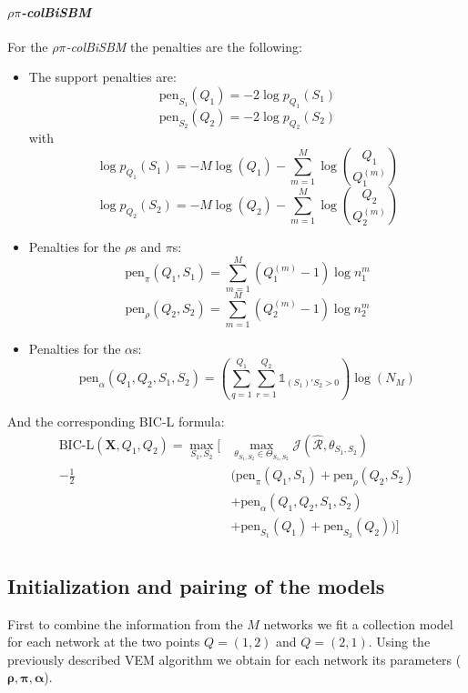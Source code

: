 \documentclass[12pt,a4paper]{report}
\begin{document}
\paragraph*{\textit{$\rho\pi$-colBiSBM}}
For the \textit{$\rho\pi$-colBiSBM} the penalties are the following:

\begin{itemize}
    \item The support penalties are:
          \[ \text{pen}_{S_1}(Q_1) = -2 \log p_{Q_1} (S_1) \]
          \[ \text{pen}_{S_2}(Q_2) = -2 \log p_{Q_2} (S_2) \]
          with
          \[ \log p_{Q_1}(S_1) = - M \log(Q_1) - \sum_{m=1}^{M} \log {Q_1 \choose Q_1^{(m)}} \]
          \[ \log p_{Q_2}(S_2) = - M \log(Q_2) - \sum_{m=1}^{M} \log {Q_2 \choose Q_2^{(m)}} \]
    \item Penalties for the $\rho$s and $\pi$s:
          \[ \text{pen}_{\pi}(Q_1, S_1) = \sum_{m=1}^{M} (Q_{1}^{(m)} - 1) \log n_{1}^{m} \]
          \[ \text{pen}_{\rho}(Q_2, S_2) = \sum_{m=1}^{M} (Q_{2}^{(m)} - 1) \log n_{2}^{m} \]
    \item Penalties for the $\alpha$s:
          \[ \text{pen}_{\alpha}(Q_1, Q_2, S_1, S_2) = (\sum_{q=1}^{Q_1} \sum_{r=1}^{Q_2} \mathbb{1}_{(S_1)'S_2 > 0}) \log (N_M) \]
\end{itemize}
And the corresponding BIC-L formula:
\[
    \begin{aligned}
        \text{BIC-L}(\bm{X},Q_1, Q_2) =
        \max_{S_1,S_2} [
                      & \max_{\theta_{S_1,S_2} \in \Theta_{S_1,S_2}} \mathcal{J}(\mathcal{\hat{R}},\theta_{S_1,S_2}) \\
        - \frac{1}{2} & (\text{pen}_{\pi}(Q_1, S_1)  + \text{pen}_{\rho}(Q_2, S_2)                                   \\
                      & + \text{pen}_{\alpha}(Q_1, Q_2, S_1, S_2)                                                    \\
                      & + \text{pen}_{S_1}(Q_1) + \text{pen}_{S_2}(Q_2))]                                            \\
    \end{aligned}
\]

\subsection{Initialization and pairing of the models}
\label{ssec:initialization-and-pairing-of-the-models}
First to combine the information from the $M$ networks we fit a collection model
for each network at the two points $Q = (1, 2)$ and $Q = (2, 1)$. Using the
previously described VEM algorithm we obtain for each network its parameters
($\bm{\rho,\pi,\alpha}$).
\end{document}
